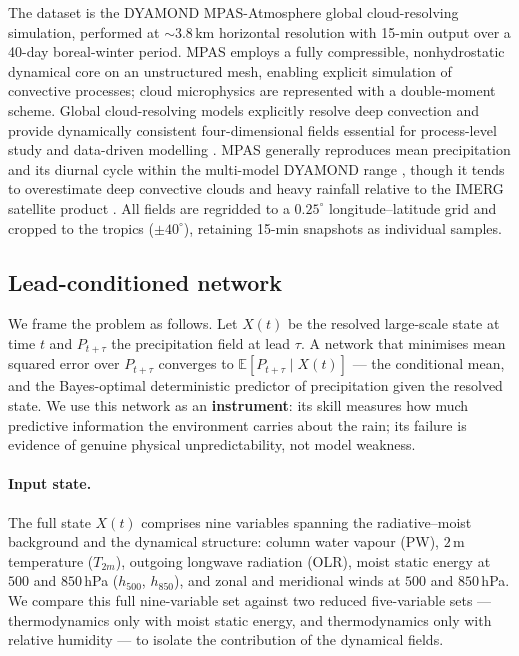 \documentclass[11pt]{article}
\begin{document}
The dataset is the DYAMOND MPAS-Atmosphere global cloud-resolving simulation,
performed at $\sim$3.8\,km horizontal resolution with 15-min output over a
40-day boreal-winter period.
MPAS employs a fully compressible, nonhydrostatic dynamical core on an
unstructured mesh, enabling explicit simulation of convective processes; cloud
microphysics are represented with a double-moment scheme.
Global cloud-resolving models explicitly resolve deep convection and provide
dynamically consistent four-dimensional fields essential for process-level study
and data-driven modelling \citep{satoh2019global}.
MPAS generally reproduces mean precipitation and its diurnal cycle within the
multi-model DYAMOND range \citep{stevens2019dyamond}, though it tends to
overestimate deep convective clouds and heavy rainfall relative to the IMERG
satellite product \citep{feng2025mpas}.
All fields are regridded to a $0.25^\circ$ longitude--latitude grid and cropped
to the tropics ($\pm40^\circ$), retaining 15-min snapshots as individual samples.

\subsection{Lead-conditioned network}
\label{sec:net}

We frame the problem as follows.
Let $X(t)$ be the resolved large-scale state at time $t$ and $P_{t+\tau}$ the
precipitation field at lead $\tau$.
A network that minimises mean squared error over $P_{t+\tau}$ converges to
$\mathbb{E}[P_{t+\tau}\mid X(t)]$ --- the conditional mean, and the Bayes-optimal
deterministic predictor of precipitation given the resolved state.
We use this network as an \textbf{instrument}: its skill measures how much
predictive information the environment carries about the rain; its failure is
evidence of genuine physical unpredictability, not model weakness.

\paragraph{Input state.}
The full state $X(t)$ comprises nine variables spanning the radiative--moist
background and the dynamical structure: column water vapour (PW), $2$\,m
temperature ($T_{2m}$), outgoing longwave radiation (OLR), moist static energy
at $500$ and $850$\,hPa ($h_{500}$, $h_{850}$), and zonal and meridional winds
at $500$ and $850$\,hPa.
We compare this full nine-variable set against two reduced five-variable sets ---
thermodynamics only with moist static energy, and thermodynamics only with
relative humidity --- to isolate the contribution of the dynamical fields.
\end{document}
